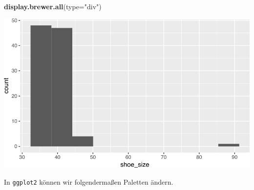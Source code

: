 \documentclass[12pt,]{book}
\newenvironment{Shaded}{\begin{snugshade}}{\end{snugshade}}
\newcommand{\KeywordTok}[1]{\textcolor[rgb]{0.13,0.29,0.53}{\textbf{{#1}}}}
\newcommand{\DataTypeTok}[1]{\textcolor[rgb]{0.13,0.29,0.53}{{#1}}}
\newcommand{\StringTok}[1]{\textcolor[rgb]{0.31,0.60,0.02}{{#1}}}
\newcommand{\NormalTok}[1]{{#1}}
\begin{document}
\begin{Shaded}
\begin{Highlighting}[]
\KeywordTok{display.brewer.all}\NormalTok{(}\DataTypeTok{type=}\StringTok{"div"}\NormalTok{)}
\end{Highlighting}
\end{Shaded}

\begin{center}\includegraphics[width=1\linewidth]{050_Daten_visualisieren_files/figure-latex/unnamed-chunk-31-1} \end{center}

In \texttt{ggplot2} können wir folgendermaßen Paletten ändern.
\end{document}
